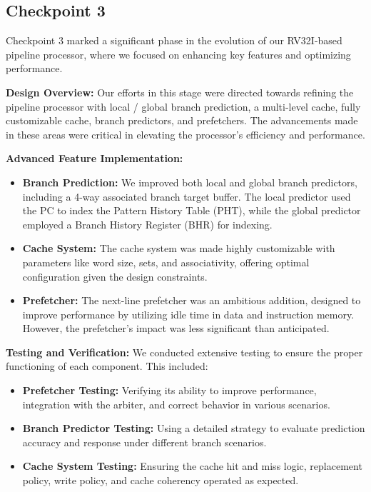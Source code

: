 \documentclass[12pt, a4paper]{article}
\begin{document}
    
    
    
    \subsection{Checkpoint 3}

    Checkpoint 3 marked a significant phase in the evolution of our RV32I-based pipeline processor, where we focused on enhancing key features and optimizing performance.

    \textbf{Design Overview:}
    Our efforts in this stage were directed towards refining the pipeline processor with local / global branch prediction, a multi-level cache, fully customizable cache, branch predictors, and prefetchers. The advancements made in these areas were critical in elevating the processor's efficiency and performance.
    
    \textbf{Advanced Feature Implementation:}
    \begin{itemize}
        \item \textbf{Branch Prediction:} We improved both local and global branch predictors, including a 4-way associated branch target buffer. The local predictor used the PC to index the Pattern History Table (PHT), while the global predictor employed a Branch History Register (BHR) for indexing.
        \item \textbf{Cache System:} The cache system was made highly customizable with parameters like word size, sets, and associativity, offering optimal configuration given the design constraints.
        \item \textbf{Prefetcher:} The next-line prefetcher was an ambitious addition, designed to improve performance by utilizing idle time in data and instruction memory. However, the prefetcher's impact was less significant than anticipated.
    \end{itemize}
    
    \textbf{Testing and Verification:}
    We conducted extensive testing to ensure the proper functioning of each component. This included:
    \begin{itemize}
        \item \textbf{Prefetcher Testing:} Verifying its ability to improve performance, integration with the arbiter, and correct behavior in various scenarios.
        \item \textbf{Branch Predictor Testing:} Using a detailed strategy to evaluate prediction accuracy and response under different branch scenarios.
        \item \textbf{Cache System Testing:} Ensuring the cache hit and miss logic, replacement policy, write policy, and cache coherency operated as expected.
    \end{itemize}
    
\end{document}
